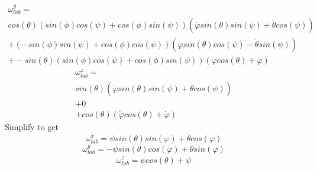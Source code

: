 \documentclass[12pt]{article}
\begin{document}
    \[
        \begin{split}
            \omega_{lab}^y =
            \\
            cos(\theta) \left(sin(\phi) cos(\psi) + cos(\phi) sin(\psi) \right) \left(\dot{\varphi} sin(\theta) sin(\psi) + \dot{\theta} cos(\psi) \right) 
            \\ 
            + \left( -sin(\phi) sin(\psi) + cos(\phi)cos(\psi) \right) \left(\dot{\varphi} sin(\theta) cos(\psi) - \dot{\theta} sin(\psi) \right)
            \\
            + -sin(\theta) \left( sin(\phi) cos(\psi) + cos(\phi) sin(\psi) \right) \left(\dot{\varphi} cos(\theta) + \dot{\varphi} \right)
        \end{split}
    \]
    \[
        \begin{split}
            \omega_{lab}^z =
            \\
            sin(\theta) \left(\dot{\varphi} sin(\theta) sin(\psi) + \dot{\theta} cos(\psi) \right) 
            \\ 
            + 0
            \\
            + cos(\theta) \left(\dot{\varphi} cos(\theta) + \dot{\varphi} \right)
        \end{split}
    \]
    Simplify to get
    \[
        \omega_{lab}^x = \dot{\psi} sin(\theta) sin(\varphi) + \dot{\theta} cos(\varphi)
    \]
    \[
        \omega_{lab}^y = -\dot{\psi} sin(\theta) cos(\varphi) + \dot{\theta} sin(\varphi)
    \]
    \[
        \omega_{lab}^z = \dot{\psi} cos(\theta) + \dot{\psi}
    \]
    
\newpage
\end{document}
